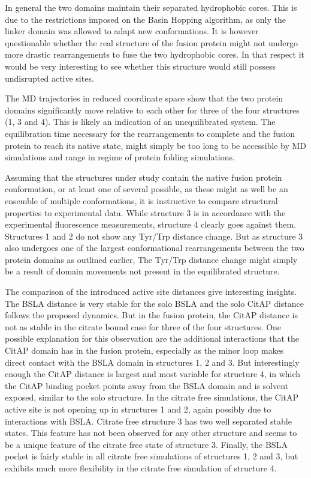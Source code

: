 \documentclass[english, a4paper, 12pt, titlepage, draft]{article}
\begin{document}
In general the two domains maintain their separated hydrophobic cores.
This is due to the restrictions imposed on the Basin Hopping algorithm, as only the linker domain was allowed to adapt new conformations.
It is however questionable whether the real structure of the fusion protein might not undergo more drastic rearrangements to fuse the two hydrophobic cores.
In that respect it would be very interesting to see whether this structure would still possess undisrupted active sites.

The MD trajectories in reduced coordinate space show that the two protein domains significantly move relative to each other for three of the four structures (1, 3 and 4).
This is likely an indication of an unequilibrated system.
The equilibration time necessary for the rearrangements to complete and the fusion protein to reach its native state, might simply be too long to be accessible by MD simulations and range in regime of protein folding simulations.


Assuming that the structures under study contain the native fusion protein conformation, or at least one of several possible, as these might as well be an ensemble of multiple conformations, it is instructive to compare structural properties to experimental data.
While structure 3 is in accordance with the experimental fluorescence measurements, structure 4 clearly goes against them.
Structures 1 and 2 do not show any Tyr/Trp distance change.
But as structure 3 also undergoes one of the largest conformational rearrangements between the two protein domains as outlined earlier,
The Tyr/Trp distance change might simply be a result of domain movements not present in the equilibrated structure.

The comparison of the introduced active site distances give interesting insights.
The BSLA distance is very stable for the solo BSLA and the solo CitAP distance follows the proposed dynamics.
But in the fusion protein, the CitAP distance is not as stable in the citrate bound case for three of the four structures.
One possible explanation for this observation are the additional interactions that the CitAP domain has in the fusion protein, especially as the minor loop makes direct contact with the BSLA domain in structures 1, 2 and 3.
But interestingly enough the CitAP distance is largest and most variable for structure 4, in which the CitAP binding pocket points away from the BSLA domain and is solvent exposed, similar to the solo structure.
In the citrate free simulations, the CitAP active site is not opening up in structures 1 and 2, again possibly due to interactions with BSLA.
Citrate free structure 3 has two well separated stable states.
This feature has not been observed for any other structure and seems to be a unique feature of the citrate free state of structure 3.
Finally, the BSLA pocket is fairly stable in all citrate free simulations of structures 1, 2 and 3, but exhibits much more flexibility in the citrate free simulation of structure 4.
\end{document}
